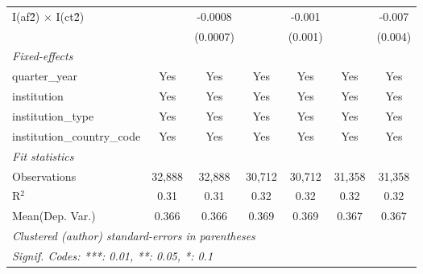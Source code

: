 \begin{tabular}{lcccccc}
   I(af\^2) $\times$ I(ct\^2)         &               & -0.0008        &               & -0.001         &               & -0.007\\   
                                      &               & (0.0007)       &               & (0.001)        &               & (0.004)\\   
   \midrule
   \emph{Fixed-effects}\\
   quarter\_year                      & Yes           & Yes            & Yes           & Yes            & Yes           & Yes\\  
   institution                        & Yes           & Yes            & Yes           & Yes            & Yes           & Yes\\  
   institution\_type                  & Yes           & Yes            & Yes           & Yes            & Yes           & Yes\\  
   institution\_country\_code         & Yes           & Yes            & Yes           & Yes            & Yes           & Yes\\  
   \midrule
   \emph{Fit statistics}\\
   Observations                       & 32,888        & 32,888         & 30,712        & 30,712         & 31,358        & 31,358\\  
   R$^2$                              & 0.31          & 0.31           & 0.32          & 0.32           & 0.32          & 0.32\\  
Mean(Dep. Var.) & 0.366 & 0.366 & 0.369 & 0.369 & 0.367 & 0.367 \\
   \midrule \midrule
   \multicolumn{7}{l}{\emph{Clustered (author) standard-errors in parentheses}}\\
   \multicolumn{7}{l}{\emph{Signif. Codes: ***: 0.01, **: 0.05, *: 0.1}}\\
\end{tabular}
\par\endgroup
